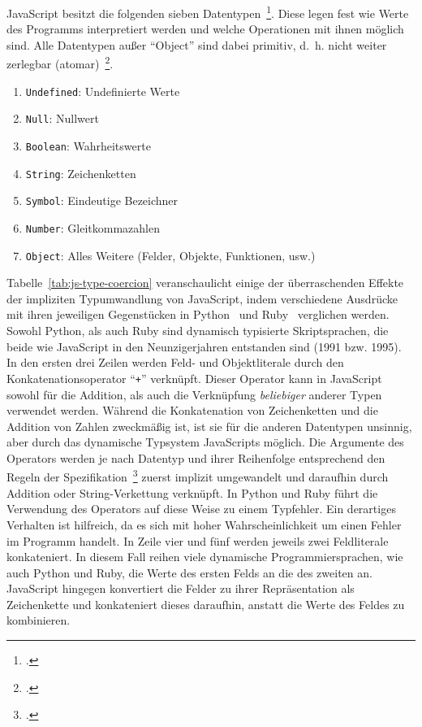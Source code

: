 JavaScript besitzt die folgenden sieben Datentypen~\footcite[Abschn.~6.1]{ECMASCRIPT:2019}.
Diese legen fest wie Werte des Programms interpretiert werden und welche Operationen mit ihnen möglich sind. Alle Datentypen außer \enquote{Object} sind dabei primitiv, d.~h. nicht weiter zerlegbar (atomar)~\footcite[Abschnitt 4.3.2]{ECMASCRIPT:2019}.

\begin{enumerate}
  \item \texttt{Undefined}: Undefinierte Werte
  \item \texttt{Null}: Nullwert
  \item \texttt{Boolean}: Wahrheitswerte
  \item \texttt{String}: Zeichenketten
  \item \texttt{Symbol}: Eindeutige Bezeichner
  \item \texttt{Number}: Gleitkommazahlen
  \item \texttt{Object}: Alles Weitere (Felder, Objekte, Funktionen, usw.)
\end{enumerate}

Tabelle~\ref{tab:js-type-coercion} veranschaulicht einige der überraschenden Effekte der impliziten Typumwandlung von JavaScript, indem verschiedene Ausdrücke mit ihren jeweiligen Gegenstücken in Python~\autocite{PYTHON3} und Ruby~\autocite{RUBY} verglichen werden. Sowohl Python, als auch Ruby sind dynamisch typisierte Skriptsprachen, die beide wie JavaScript in den Neunzigerjahren entstanden sind (1991 bzw. 1995).
In den ersten drei Zeilen werden Feld- und Objektliterale durch den Konkatenationsoperator \enquote{\texttt{+}} verknüpft. Dieser Operator kann in JavaScript sowohl für die Addition, als auch die Verknüpfung \emph{beliebiger} anderer Typen verwendet werden. Während die Konkatenation von Zeichenketten und die Addition von Zahlen zweckmäßig ist, ist sie für die anderen Datentypen unsinnig, aber durch das dynamische Typsystem JavaScripts möglich. Die Argumente des Operators werden je nach Datentyp und ihrer Reihenfolge entsprechend den Regeln der Spezifikation~\footcite[Abschn.~12.8.3]{ECMASCRIPT:2019} zuerst implizit umgewandelt und daraufhin durch Addition oder String-Verkettung verknüpft. In Python und Ruby führt die Verwendung des Operators auf diese Weise zu einem Typfehler. Ein derartiges Verhalten ist hilfreich, da es sich mit hoher Wahrscheinlichkeit um einen Fehler im Programm handelt.
In Zeile vier und fünf werden jeweils zwei Feldliterale konkateniert. In diesem Fall reihen viele dynamische Programmiersprachen, wie auch Python und Ruby, die Werte des ersten Felds an die des zweiten an. JavaScript hingegen konvertiert die Felder zu ihrer Repräsentation als Zeichenkette und konkateniert dieses daraufhin, anstatt die Werte des Feldes zu kombinieren.

